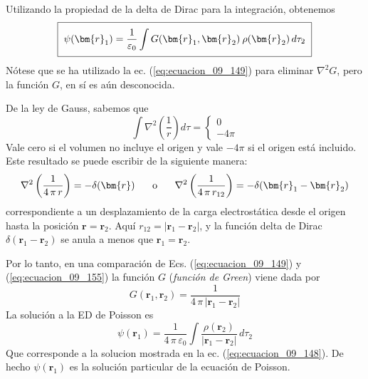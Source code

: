 Utilizando la propiedad de la delta de Dirac para la integración, obtenemos
\begin{equation}
\setlength{\fboxsep}{2\fboxsep}\boxed{\psi(\bm{r}_{1}) = \dfrac{1}{\varepsilon_{0}} \int G(\bm{r}_{1}, \bm{r}_{2}) \: \rho (\bm{r}_{2}) \, d \tau_{2} }
\label{eq:ecuacion_09_153}
\end{equation}
Nótese que se ha utilizado la ec. (\ref{eq:ecuacion_09_149}) para eliminar $\nabla^{2} G$, pero la función $G$, en sí es aún desconocida.
\par
De la ley de Gauss, sabemos que
\begin{equation}
\int \nabla^{2} \left( \dfrac{1}{r} \right) d \tau =
\begin{cases}
0 \\
- 4 \pi
\end{cases}
\label{eq:ecuacion_09_154}
\end{equation}
Vale cero si el volumen no incluye el origen y vale $-4 \pi$ si el origen está incluido. Este resultado se puede escribir de la siguiente manera:
\begin{equation}
\nabla^{2} \left( \dfrac{1}{4 \, \pi \, r} \right) = - \delta (\bm{r}) \hspace{0.5cm} \mbox{ o } \hspace{0.5cm} \nabla^{2} \left( \dfrac{1}{4 \, \pi \, r_{12}} \right) = - \delta (\bm{r}_{1} - \bm{r}_{2})
\label{eq:ecuacion_09_155}
\end{equation}
correspondiente a un desplazamiento de la carga electrostática desde el origen hasta la posición $\bm{r} = \bm{r}_{2}$. Aquí $r_{12} = \vert \bm{r}_{1} - \bm{r}_{2} \vert$, y la función delta de Dirac $\delta (\bm{r}_{1} - \bm{r}_{2})$ se anula a menos que $\bm{r}_{1} = \bm{r}_{2}$. 
\par
Por lo tanto, en una comparación de Ecs. (\ref{eq:ecuacion_09_149}) y (\ref{eq:ecuacion_09_155}) la función $G$ (\emph{función de Green}) viene dada por
\begin{equation}
G (\bm{r}_{1} , \bm{r}_{2}) = \dfrac{1}{4 \, \pi \, \vert \bm{r}_{1} - \bm{r}_{2} \vert}
\label{eq:ecuacion_09_156}
\end{equation}
La solución a la ED de Poisson es
\begin{equation}
\psi (\bm{r}_{1}) = \dfrac{1}{4 \, \pi \, \varepsilon_{0}} \int \dfrac{\rho (\bm{r}_{2})}{\vert \bm{r}_{1} - \bm{r}_{2} \vert} \, d \tau_{2}
\label{eq:ecuacion_09_157}
\end{equation}
Que corresponde a la solucion mostrada en la ec. (\ref{eq:ecuacion_09_148}). De hecho $\psi (\bm{r}_{1})$ es la solución particular de la ecuación de Poisson.
